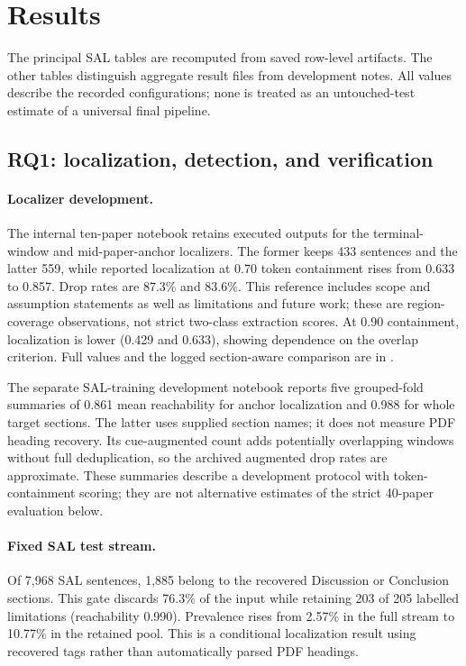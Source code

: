 \section{Results}
\label{S:results}

The principal SAL tables are recomputed from saved row-level artifacts. The other tables distinguish
aggregate result files from development notes. All values describe the recorded configurations;
none is treated as an untouched-test estimate of a universal final pipeline.

\subsection{RQ1: localization, detection, and verification}

\paragraph{Localizer development.}
The internal ten-paper notebook retains executed outputs for the terminal-window and
mid-paper-anchor localizers. The former keeps 433 sentences and the latter 559, while reported
localization at 0.70 token containment rises from 0.633 to 0.857. Drop rates are 87.3\% and
83.6\%. This reference includes scope and assumption statements as well as limitations and
future work; these are region-coverage observations, not strict two-class extraction scores.
At 0.90 containment, localization is lower (0.429 and 0.633), showing dependence on the overlap
criterion. Full values and the logged section-aware comparison are in .

The separate SAL-training development notebook reports five grouped-fold summaries of 0.861
mean reachability for anchor localization and 0.988 for whole target sections. The latter uses
supplied section names; it does not measure PDF heading recovery. Its cue-augmented count adds
potentially overlapping windows without full deduplication, so the archived augmented drop rates
are approximate. These summaries describe a development protocol with token-containment scoring;
they are not alternative estimates of the strict 40-paper evaluation below.

\paragraph{Fixed SAL test stream.}
Of 7,968 SAL sentences, 1,885 belong to the recovered Discussion or Conclusion sections.
This gate discards 76.3\% of the input while retaining 203 of 205 labelled limitations
(reachability 0.990). Prevalence rises from 2.57\% in the full stream to 10.77\% in the retained
pool. This is a conditional localization result using recovered tags rather than automatically
parsed PDF headings.

